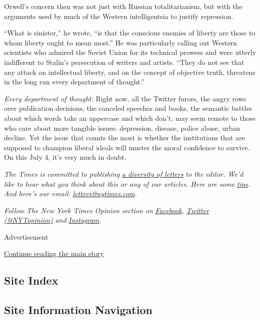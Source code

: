 Orwell's concern then was not just with Russian totalitarianism, but
with the arguments used by much of the Western intelligentsia to justify
repression.

``What is sinister,'' he wrote, ``is that the conscious enemies of
liberty are those to whom liberty ought to mean most.'' He was
particularly calling out Western scientists who admired the Soviet Union
for its technical prowess and were utterly indifferent to Stalin's
persecution of writers and artists. ``They do not see that any attack on
intellectual liberty, and on the concept of objective truth, threatens
in the long run every department of thought.''

\emph{Every department of thought.} Right now, all the Twitter furors,
the angry rows over publication decisions, the canceled speeches and
books, the semantic battles about which words take an uppercase and
which don't, may seem remote to those who care about more tangible
issues: depression, disease, police abuse, urban decline. Yet the issue
that counts the most is whether the institutions that are supposed to
champion liberal ideals will muster the moral confidence to survive. On
this July 4, it's very much in doubt.

\emph{The Times is committed to publishing}
\href{https://www.nytimes.com/2019/01/31/opinion/letters/letters-to-editor-new-york-times-women.html}{\emph{a
diversity of letters}} \emph{to the editor. We'd like to hear what you
think about this or any of our articles. Here are some}
\href{https://help.nytimes.com/hc/en-us/articles/115014925288-How-to-submit-a-letter-to-the-editor}{\emph{tips}}\emph{.
And here's our email:}
\href{mailto:letters@nytimes.com}{\emph{letters@nytimes.com}}\emph{.}

\emph{Follow The New York Times Opinion section on}
\href{https://www.facebook.com/nytopinion}{\emph{Facebook}}\emph{,}
\href{http://twitter.com/NYTOpinion}{\emph{Twitter (@NYTopinion)}}
\emph{and}
\href{https://www.instagram.com/nytopinion/}{\emph{Instagram}}\emph{.}

Advertisement

\protect\hyperlink{after-bottom}{Continue reading the main story}

\hypertarget{site-index}{%
\subsection{Site Index}\label{site-index}}

\hypertarget{site-information-navigation}{%
\subsection{Site Information
Navigation}\label{site-information-navigation}}

